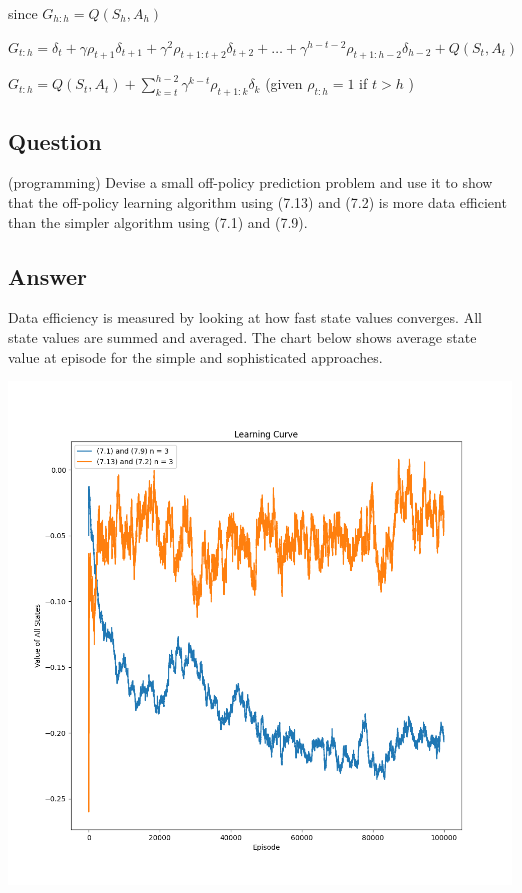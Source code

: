 \documentclass[11pt]{article}
\begin{document}
    \noindent since $ G_{h:h} = Q(S_h,A_h) $

    \noindent $ G_{t:h} = \delta_{t} + \gamma \rho_{t+1} \delta_{t+1} + \gamma^2 \rho_{t+1:t+2} \delta_{t+2} + \dots +  \gamma^{h-t-2} \rho_{t+1:h-2} \delta_{h-2} + Q(S_t,A_t) $

    \noindent $ G_{t:h} = Q(S_t,A_t) + \sum_{k=t}^{h-2} \gamma^{k-t} \rho_{t+1:k} \delta_k $ (given $ \rho_{t:h} = 1$ if $ t>h $ )


    \subsection{Question}

    (programming) Devise a small off-policy prediction problem and use it to show that the off-policy learning algorithm using (7.13) and (7.2) is more data efficient than the simpler algorithm using (7.1) and (7.9).

    \subsection*{Answer}

    Data efficiency is measured by looking at how fast state values converges.
    All state values are summed and averaged.
    The chart below shows average state value at episode for the simple and sophisticated approaches.

    \includegraphics[scale=0.5]{figure_7_10}
\end{document}
